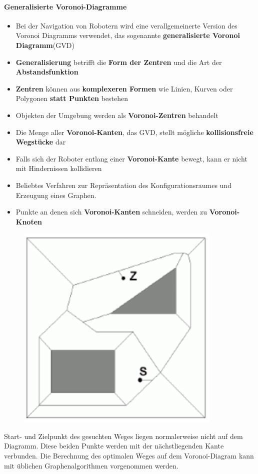 \paragraph{Generalisierte Voronoi-Diagramme}
\begin{itemize}
	\item Bei der Navigation von Robotern wird eine verallgemeinerte Version des Voronoi Diagramms verwendet, das sogenannte \textbf{generalisierte Voronoi Diagramm}(GVD)
	\item \textbf{Generalisierung} betrifft die \textbf{Form der Zentren} und die Art der \textbf{Abstandsfunktion}
	\item \textbf{Zentren} können aus \textbf{komplexeren Formen} wie Linien, Kurven oder Polygonen \textbf{statt Punkten} bestehen
	\item Objekten der Umgebung werden als \textbf{Voronoi-Zentren} behandelt
	\item Die Menge aller \textbf{Voronoi-Kanten}, das GVD, stellt mögliche \textbf{kollisionsfreie Wegstücke} dar
	\item Falls sich der Roboter entlang einer \textbf{Voronoi-Kante} bewegt, kann er nicht mit Hindernissen kollidieren
	\item Beliebtes Verfahren zur Repräsentation des Konfigurationsraumes und Erzeugung eines Graphen.
	\item Punkte an denen sich \textbf{Voronoi-Kanten} schneiden, werden zu \textbf{Voronoi-Knoten}
\end{itemize}
\begin{figure}[H]
	\begin{center}
		\includegraphics[scale=0.6]{Resources/PNG/Voronoi.PNG}
		\caption{}
		\label{fig:PNG/Voronoi.PNG}
	\end{center}
\end{figure}
Start- und Zielpunkt des gesuchten Weges liegen normalerweise nicht auf dem Diagramm.
Diese beiden Punkte werden mit der nächstliegenden Kante verbunden.
Die Berechnung des optimalen Weges auf dem Voronoi-Diagram kann mit üblichen Graphenalgorithmen vorgenommen werden.
